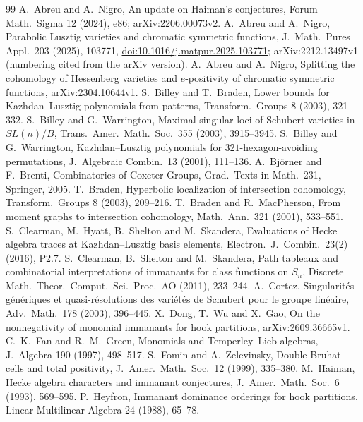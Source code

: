 \documentclass[11pt]{amsart}
\theoremstyle{definition}
\theoremstyle{remark}
\begin{document}
\begin{thebibliography}{99}
 A.~Abreu and A.~Nigro, An update on Haiman's conjectures, Forum Math.\ Sigma 12 (2024), e86; arXiv:2206.00073v2.
 A.~Abreu and A.~Nigro, Parabolic Lusztig varieties and chromatic symmetric functions, J.\ Math.\ Pures Appl.\ 203 (2025), 103771, \href{https://doi.org/10.1016/j.matpur.2025.103771}{doi:10.1016/j.matpur.2025.103771}; arXiv:2212.13497v1 (numbering cited from the arXiv version).
 A.~Abreu and A.~Nigro, Splitting the cohomology of Hessenberg varieties and $e$-positivity of chromatic symmetric functions, arXiv:2304.10644v1.
 S.~Billey and T.~Braden, Lower bounds for Kazhdan--Lusztig polynomials from patterns, Transform.\ Groups 8 (2003), 321--332.
 S.~Billey and G.~Warrington, Maximal singular loci of Schubert varieties in $SL(n)/B$, Trans.\ Amer.\ Math.\ Soc.\ 355 (2003), 3915--3945.
 S.~Billey and G.~Warrington, Kazhdan--Lusztig polynomials for $321$-hexagon-avoiding permutations, J.\ Algebraic Combin.\ 13 (2001), 111--136.
 A.~Bj\"orner and F.~Brenti, Combinatorics of Coxeter Groups, Grad.\ Texts in Math.\ 231, Springer, 2005.
 T.~Braden, Hyperbolic localization of intersection cohomology, Transform.\ Groups 8 (2003), 209--216.
 T.~Braden and R.~MacPherson, From moment graphs to intersection cohomology, Math.\ Ann.\ 321 (2001), 533--551.
 S.~Clearman, M.~Hyatt, B.~Shelton and M.~Skandera, Evaluations of Hecke algebra traces at Kazhdan--Lusztig basis elements, Electron.\ J.\ Combin.\ 23(2) (2016), P2.7.
 S.~Clearman, B.~Shelton and M.~Skandera, Path tableaux and combinatorial interpretations of immanants for class functions on $S_n$, Discrete Math.\ Theor.\ Comput.\ Sci.\ Proc.\ AO (2011), 233--244.
 A.~Cortez, Singularit\'es g\'en\'eriques et quasi-r\'esolutions des vari\'et\'es de Schubert pour le groupe lin\'eaire, Adv.\ Math.\ 178 (2003), 396--445.
 X.~Dong, T.~Wu and X.~Gao, On the nonnegativity of monomial immanants for hook partitions, arXiv:2609.36665v1.
 C.~K.~Fan and R.~M.~Green, Monomials and Temperley--Lieb algebras, J.\ Algebra 190 (1997), 498--517.
 S.~Fomin and A.~Zelevinsky, Double Bruhat cells and total positivity, J.\ Amer.\ Math.\ Soc.\ 12 (1999), 335--380.
 M.~Haiman, Hecke algebra characters and immanant conjectures, J.\ Amer.\ Math.\ Soc.\ 6 (1993), 569--595.
 P.~Heyfron, Immanant dominance orderings for hook partitions, Linear Multilinear Algebra 24 (1988), 65--78.

\end{thebibliography}
\end{document}
